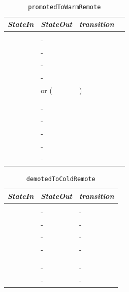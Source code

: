 \begin{table}
  \begin{tabular}[h]{llll}
    \textit{StateIn}         & \textit{StateOut} & \textit{transition} \\\hline\\[2pt]
    \InitialState{}          & - & \\[8pt]
    \ReservedOutboundState{} & - & \\[8pt]
    \UnnegotiatedStateAny{}  & - & \\[8pt]
    \OutboundStateUni{}      & - & \\[8pt]
    \OutboundStateDup{}      & \Prune{} or (\DuplexState{} & \PromotedToWarmDupRem{}) \\[8pt]
    \InboundIdleStateUni{}   & \InboundStateUni{} & \AwakeUniRem{} \\[8pt]
    \InboundIdleStateDup{}   & \InboundStateDup{} & \AwakeDupRem{} \\[8pt]
    \InboundStateUni{}       & - & \\[8pt]
    \InboundStateDup{}       & - & \\[8pt]
    \DuplexState{}           & - & \\[8pt]
    \TerminatingState{}      & - & \\[8pt]
    \TerminatedState{}       & - & \\[8pt]
  \end{tabular}
  \caption{\texttt{promotedToWarmRemote}}
  \label{table:promotedToWarmRemote}
\end{table}

\begin{table}
  \begin{tabular}[h]{lll}
    \textit{StateIn}         & \textit{StateOut} & \textit{transition} \\\hline\\[2pt]
    \ReservedOutboundState{} & - & - \\[8pt]
    \UnnegotiatedStateAny{}  & - & - \\[8pt]
    \OutboundStateAny{}      & - & - \\[8pt]
    \InboundIdleStateAny{}   & - & - \\[8pt]
    \InboundStateAny{}       & \InboundIdleStateAny{} & \DemotedToColdAnyRem{} \\[8pt]
    \DuplexState{}           & \OutboundStateDupTau{} & \DemotedToColdDupRem{} \\[8pt]
    \TerminatingState{}      & - & - \\[8pt]
    \TerminatedState{}       & - & - \\[8pt]
  \end{tabular}
  \caption{\texttt{demotedToColdRemote}}
  \label{table:demotedToColdRemote}
\end{table}

